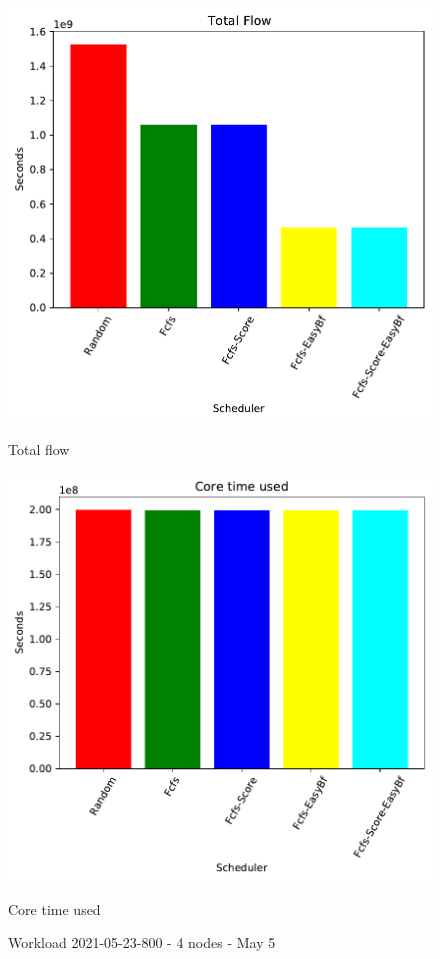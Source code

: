 \documentclass[a4paper]{article}
\begin{document}
\begin{figure}[H]
	\begin{minipage}[b]{0.5\linewidth}\centering\includegraphics[width=1.11\linewidth]{MBSS/plot/2021-05-23-800_Total_flow.pdf}\caption{Total flow}\vspace{4ex}\end{minipage}
	\begin{minipage}[b]{0.5\linewidth}\centering\includegraphics[width=1.11\linewidth]{MBSS/plot/2021-05-23-800_Core_time_used.pdf}\caption{Core time used}\vspace{4ex}\end{minipage}\caption{Workload 2021-05-23-800 - 4 nodes - May 5}\end{figure}
\end{document}
